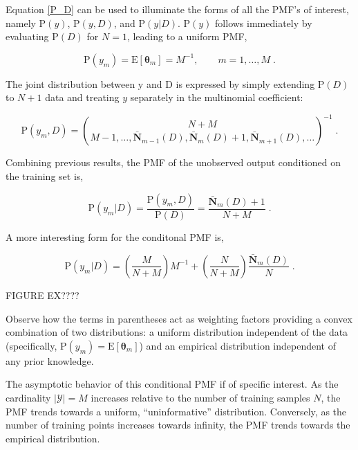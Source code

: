\documentclass[12pt]{article}
\begin{document}
Equation \eqref{P_D} can be used to illuminate the forms of all the PMF's of interest, namely $\text{P}(y)$, $\text{P}(y,D)$, and $\text{P}(y | D)$.  $\text{P}(y)$ follows immediately by evaluating $\text{P}(D)$ for $N=1$, leading to a uniform PMF,

\begin{equation}
\text{P}(y_m) = \text{E}[\bm{\theta}_m] = M^{-1}, \qquad m=1,\ldots,M \;.
\end{equation}

The joint distribution between $\mathrm{y}$ and $\mathrm{D}$ is expressed by simply extending $\text{P}(D)$ to $N+1$ data and treating $y$ separately in the multinomial coefficient:

\begin{equation}
\text{P}(y_m,D) = \binom{N+M}{M-1,\ldots,\bar{\bm{N}}_{m-1}(D),\bar{\bm{N}}_m(D)+1,\bar{\bm{N}}_{m+1}(D),\ldots}^{-1} \;.
\end{equation}

Combining previous results, the PMF of the unobserved output conditioned on the training set is,

\begin{equation} \label{P_y_D_basic}
\text{P}(y_m | D) = \frac{\text{P}(y_m,D)}{\text{P}(D)} = \frac{\bar{\bm{N}}_m(D)+1}{N+M} \;.
\end{equation}

A more interesting form for the conditonal PMF is,

\begin{equation} \label{P_y_D}
\text{P}(y_m | D) = \left(\frac{M}{N+M}\right) M^{-1} + \left(\frac{N}{N+M}\right) \frac{\bar{\bm{N}}_m(D)}{N} \;.
\end{equation}

FIGURE EX????

Observe how the terms in parentheses act as weighting factors providing a convex combination of two distributions: a uniform distribution independent of the data (specifically, $\text{P}(y_m) = \text{E}[\bm{\theta}_m]$) and an empirical distribution independent of any prior knowledge.

The asymptotic behavior of this conditional PMF if of specific interest. As the cardinality $|\mathcal{Y}| = M$ increases relative to the number of training samples $N$, the PMF trends towards a uniform, ``uninformative'' distribution. Conversely, as the number of training points increases towards infinity, the PMF trends towards the empirical distribution. 
\end{document}
